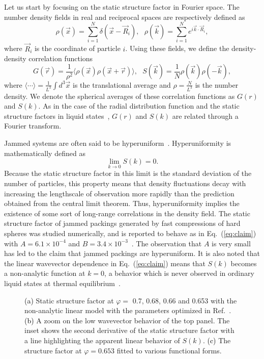 \documentclass[aps,pre,twocolumn,superscriptaddress]{revtex4-1}
\renewcommand{\phi}{\varphi}
\newcommand{\be}{\begin{equation}}
\newcommand{\ee}{\end{equation}}
\newcommand{\red}[1]{\textcolor{black}{#1}}
\newcommand{\ave}[1]{\langle {#1} \rangle}
\begin{document}
Let us start by focusing on the static structure 
factor in Fourier space. 
The number density fields in real and reciprocal spaces are 
respectively defined as~\cite{hansen} 
\be
\rho(\vec{x}) = \sum_{i=1}^N \delta(\vec{x} - \vec{R}_i), \ \ \ 
\rho(\vec{k}) = \sum_{i=1}^N e^{i\vec{k} \cdot \vec{R}_i},
\ee
where $\vec{R}_i$ is the coordinate of particle $i$.
Using these fields, we define the density-density correlation functions
\be
G(\vec{r}) = \frac{1}{\rho^2} \ave{\rho(\vec{x}) \rho(\vec{x}+\vec{r})}, 
\ \ \  S(\vec{k}) = \frac{1}{N} \rho(\vec{k}) \rho (-\vec{k}),  \label{eq:gofr}
\ee
where $\ave{ \cdots } = \frac{1}{L^3}\int d^3\vec{x}$ 
is the translational average
and $\rho = \frac{N}{L^3}$ is the number density. 
We denote the spherical averages of 
these correlation functions as $G(r)$ and $S(k)$. 
As in the case of the radial distribution 
function and the static structure factors in liquid states~\cite{hansen}, 
$G(r)$ and $S(k)$ are related through a Fourier transform.

Jammed systems are often said to be hyperuniform~\cite{donev2005}. 
Hyperuniformity is mathematically defined as~\cite{more_sal}
\be
\lim_{k \to 0}S(k) = 0. 
\ee 
Because the static structure factor in this limit is the standard 
deviation of the number of particles, 
this property means that density fluctuations decay 
with increasing the lengthscale of observation
more rapidly than the prediction obtained from the central limit theorem.  
Thus, hyperuniformity implies the existence of 
some sort of long-range correlations in the density field. 
The static structure factor of jammed packings generated by 
fast compressions of hard spheres was studied numerically, 
and is reported to behave as in Eq.~(\ref{eq:claim})
with $A = 6.1 \times 10^{-4}$ and $B = 3.4 \times 10^{-3}$~\cite{donev2005}. 
The observation that $A$ is very small has led to the 
claim that jammed packings are hyperuniform.  
It is also noted that the linear wavevector dependence 
in Eq.~(\ref{eq:claim}) means that $S(k)$ becomes a 
non-analytic function at $k=0$, a behavior which is 
never observed in ordinary liquid states at thermal 
equilibrium~\cite{hansen}.

\begin{figure}
\caption{\red{(a)} Static structure factor at 
$\phi =$ 0.7, 0.68, 0.66 and 0.653 with the non-analytic linear model 
with the parameters optimized in Ref.~\cite{donev2005}. 
\red{(b)} A zoom on the low wavevector behavior of the top panel. 
The inset shows the second derivative of the static 
structure factor with a line highlighting the apparent linear
behavior of $S(k)$. 
\red{(c)} The structure factor at $\phi=0.653$ fitted 
to various functional forms.}
\label{fig:sk}
\end{figure}
\end{document}
